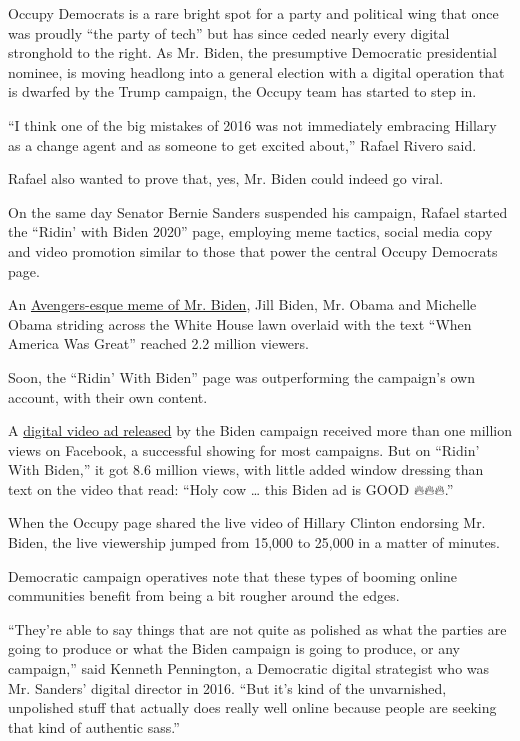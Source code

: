 Occupy Democrats is a rare bright spot for a party and political wing
that once was proudly ``the party of tech'' but has since ceded nearly
every digital stronghold to the right. As Mr. Biden, the presumptive
Democratic presidential nominee, is moving headlong into a general
election with a digital operation that is dwarfed by the Trump campaign,
the Occupy team has started to step in.

``I think one of the big mistakes of 2016 was not immediately embracing
Hillary as a change agent and as someone to get excited about,'' Rafael
Rivero said.

Rafael also wanted to prove that, yes, Mr. Biden could indeed go viral.

On the same day Senator Bernie Sanders suspended his campaign, Rafael
started the ``Ridin' with Biden 2020'' page, employing meme tactics,
social media copy and video promotion similar to those that power the
central Occupy Democrats page.

An
\href{https://www.facebookcorewwwi.onion/ridinwithbiden2020/posts/119595033036839}{Avengers-esque
meme of Mr. Biden}, Jill Biden, Mr. Obama and Michelle Obama striding
across the White House lawn overlaid with the text ``When America Was
Great'' reached 2.2 million viewers.

Soon, the ``Ridin' With Biden'' page was outperforming the campaign's
own account, with their own content.

A
\href{https://www.facebookcorewwwi.onion/7860876103/videos/3085674444800331}{digital
video ad released} by the Biden campaign received more than one million
views on Facebook, a successful showing for most campaigns. But on
``Ridin' With Biden,'' it got 8.6 million views, with little added
window dressing than text on the video that read: ``Holy cow \ldots{}
this Biden ad is GOOD 🔥🔥🔥.''

When the Occupy page shared the live video of Hillary Clinton endorsing
Mr. Biden, the live viewership jumped from 15,000 to 25,000 in a matter
of minutes.

Democratic campaign operatives note that these types of booming online
communities benefit from being a bit rougher around the edges.

``They're able to say things that are not quite as polished as what the
parties are going to produce or what the Biden campaign is going to
produce, or any campaign,'' said Kenneth Pennington, a Democratic
digital strategist who was Mr. Sanders' digital director in 2016. ``But
it's kind of the unvarnished, unpolished stuff that actually does really
well online because people are seeking that kind of authentic sass.''

